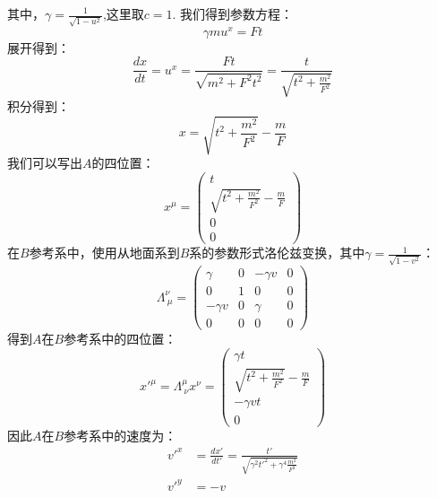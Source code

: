\documentclass{assignment}
\begin{document}
    其中，$\gamma = \frac{1}{\sqrt{1-u^2}}$,这里取$c = 1$.
    我们得到参数方程：
    \begin{equation}
        \gamma m u^x = Ft
    \end{equation}
    展开得到：
    \begin{equation}
        \frac{dx}{dt} = u^x = \frac{Ft}{\sqrt{m^2 + F^2t^2}} = \frac{t}{\sqrt{t^2 + \frac{m^2}{F^2}}}
    \end{equation}
    积分得到：
    \begin{equation}
        x = \sqrt{t^2 + \frac{m^2}{F^2}} - \frac{m}{F}
    \end{equation}
    我们可以写出$A$的四位置：
    \begin{equation}
        x^\mu = \left(
            \begin{array}{c}
                t\\
                \sqrt{t^2 + \frac{m^2}{F^2}} - \frac{m}{F}\\
                0\\
                0
            \end{array}
        \right)
    \end{equation}
    在$B$参考系中，使用从地面系到$B$系的参数形式洛伦兹变换，其中$\gamma = \frac{1}{\sqrt{1-v^2}}$：
    \begin{equation}
        \Lambda^\nu_{\ \mu} = \left(
            \begin{array}{cccc}
                \gamma & 0 & -\gamma v & 0\\
                0 & 1 & 0 & 0\\
                -\gamma v & 0 & \gamma & 0\\
                0 & 0 & 0 & 0
            \end{array}
        \right)
    \end{equation}
    得到$A$在$B$参考系中的四位置：
    \begin{equation}
        x'^\mu = \Lambda^\mu_{\ \nu}x^\nu = \left(
            \begin{array}{c}
                \gamma t\\
                \sqrt{t^2 + \frac{m^2}{F^2}} - \frac{m}{F}\\
                -\gamma vt\\
                0
            \end{array}
        \right)
    \end{equation}
    因此$A$在$B$参考系中的速度为：
    \begin{equation}
        \begin{aligned}
        v'^x &= \frac{dx'}{dt'} = \frac{t'}{\sqrt{\gamma^2 t'^2 + \gamma^4 \frac{m^2}{F^2}}}\\
        v'^y &= -v
        \end{aligned}
    \end{equation}
\end{document}
